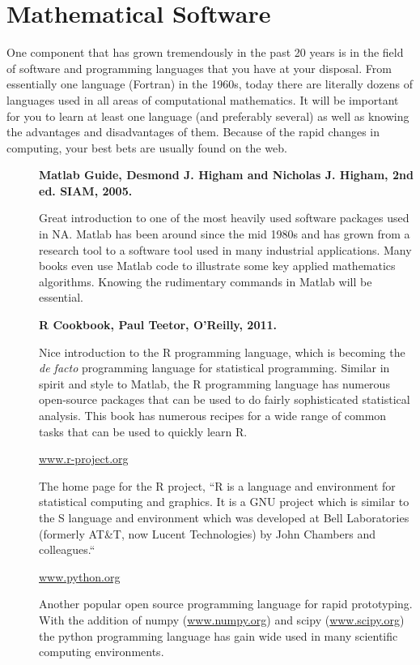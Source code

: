 \documentclass[11pt]{article}
\begin{document}
\section{Mathematical Software}
One component that has grown tremendously in the past 20 years is in the field of software and programming languages that you have at your disposal.  From essentially one language (Fortran) in the 1960s, today there are literally dozens of languages used in all areas of computational mathematics.  It will be important for you to learn at least one language (and preferably several) as well as knowing the advantages and disadvantages of them.  Because of the rapid changes in computing, your best bets are usually found on the web.

\begin{description}
\item[ ] {\bf Matlab Guide, Desmond J. Higham and Nicholas J. Higham, 2nd ed. SIAM, 2005.}  

Great introduction to one of the most heavily used software packages used in NA.  Matlab has been around since the mid 1980s and has grown from a research tool to a software tool used in many industrial applications.  Many books even use Matlab code to illustrate some key applied mathematics algorithms.  Knowing the rudimentary commands in Matlab will be essential.


\item[ ] {\bf R Cookbook, Paul Teetor, O'Reilly, 2011.} 

Nice introduction to the R programming language, which is becoming the {\it de facto} programming language for statistical programming.  Similar in spirit and style to Matlab, the R programming language has numerous open-source packages that can be used to do fairly sophisticated statistical analysis.  This book has numerous recipes for a wide range of common tasks that can be used to quickly learn R.

\item[] {\url{www.r-project.org}} 

The home page for the R project, ``R is a language and environment for statistical computing and graphics. It is a GNU project which is similar to the S language and environment which was developed at Bell Laboratories (formerly AT\&T, now Lucent Technologies) by John Chambers and colleagues.``


\item[] {\url{www.python.org}} 

Another popular open source programming language for rapid prototyping.  With the addition of numpy (\url{www.numpy.org}) and scipy (\url{www.scipy.org}) the python programming language has gain wide used in many scientific computing environments.

\end{description}
\end{document}
